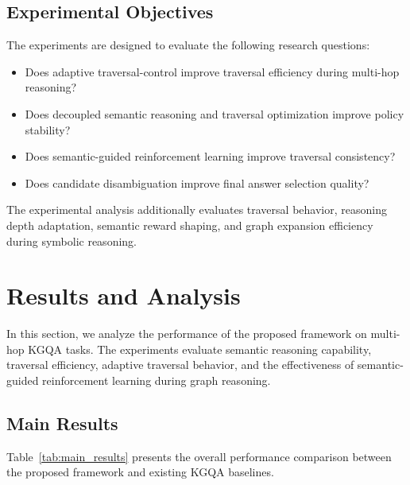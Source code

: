 \documentclass[10pt,conference]{IEEEtran}
\begin{document}
\subsection{Experimental Objectives}

The experiments are designed to evaluate the following research questions:

\begin{itemize}

\item Does adaptive traversal-control improve traversal efficiency during multi-hop reasoning?

\item Does decoupled semantic reasoning and traversal optimization improve policy stability?

\item Does semantic-guided reinforcement learning improve traversal consistency?

\item Does candidate disambiguation improve final answer selection quality?

\end{itemize}

The experimental analysis additionally evaluates traversal behavior, reasoning depth adaptation, semantic reward shaping, and graph expansion efficiency during symbolic reasoning.



\section{Results and Analysis}

In this section, we analyze the performance of the proposed framework on multi-hop KGQA tasks. The experiments evaluate semantic reasoning capability, traversal efficiency, adaptive traversal behavior, and the effectiveness of semantic-guided reinforcement learning during graph reasoning.

\subsection{Main Results}

Table~\ref{tab:main_results} presents the overall performance comparison between the proposed framework and existing KGQA baselines.
\end{document}
